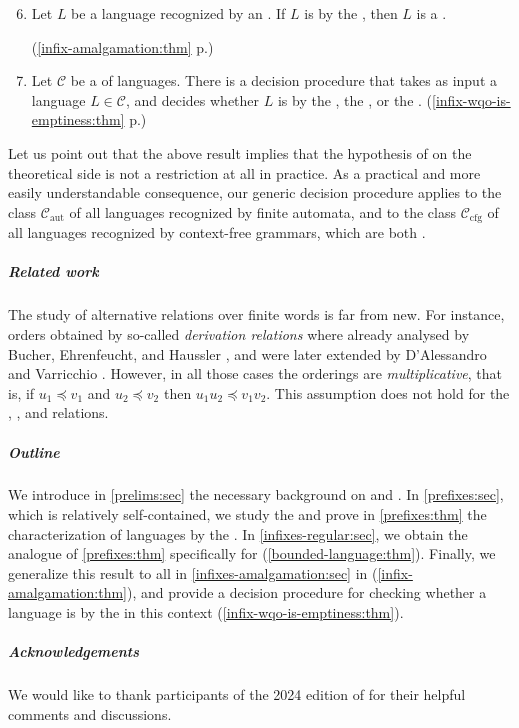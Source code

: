 {
\renewcommand{\labelenumi}{R\arabic{enumi}}
\begin{enumerate}
    \setcounter{enumi}{5}
    \item 
        Let $L$ be a language recognized by an .
        If $L$ is  by the ,
        then $L$ is a .

        \hfill (\cref{infix-amalgamation:thm} p.\pageref{infix-amalgamation:thm})
    \item 
        Let $\mathcal{C}$ be a  of languages.
        There is a decision procedure that takes as input a language $L \in \mathcal{C}$,
        and decides whether $L$ is  by the ,
        the , or the . 
        \hfill (\cref{infix-wqo-is-emptiness:thm} p.\pageref{infix-wqo-is-emptiness:thm})
\end{enumerate}
}
Let us point out that the above result implies that the hypothesis of
 on the theoretical side is not a restriction at all in
practice. As a practical and more easily understandable 
consequence,
our generic decision procedure applies 
to the class $\mathcal{C}_\text{aut}$ of all languages recognized by finite automata,
and to the class $\mathcal{C}_\text{cfg}$ of all languages recognized by context-free grammars,
which are both .


\subparagraph{Related work} The study of alternative 
relations over finite words is far from new. For instance, orders obtained by
so-called \emph{derivation relations} where already analysed by Bucher,
Ehrenfeucht, and Haussler \cite{BUEUD85}, and were later extended by
D'Alessandro and Varricchio \cite{ALVA03,ALVA06}. However, in all those cases
the orderings are \emph{multiplicative}, that is, if $u_1 \preceq v_1$ and $u_2
\preceq v_2$ then $u_1u_2 \preceq v_1v_2$. This assumption does not hold for
the , , and  relations.

\subparagraph{Outline} 
We introduce in \cref{prelims:sec} the
necessary background on  and .
In
\cref{prefixes:sec}, which is relatively
self-contained, we study the  and prove in
\cref{prefixes:thm} the characterization of 
languages by the . In
\cref{infixes-regular:sec}, we
obtain the  analogue of \cref{prefixes:thm}
specifically for 
(\cref{bounded-language:thm}). Finally, 
we generalize this result to all
 in \cref{infixes-amalgamation:sec}
in
(\cref{infix-amalgamation:thm}),
and provide a decision procedure for checking whether a language is
 by the  in
this context (\cref{infix-wqo-is-emptiness:thm}).

\subparagraph{Acknowledgements} We would like to thank participants of the 2024
edition of  for their helpful comments and discussions.
